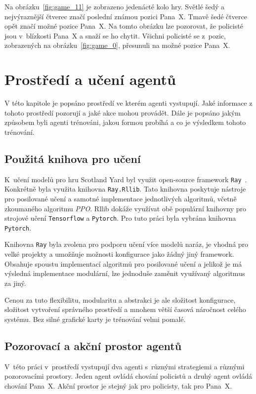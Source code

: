 Na obrázku~\ref{fig:game_11} je zobrazeno jedenácté kolo hry.
Světlé šedý a nejvýraznější čtverec značí poslední známou pozici Pana~X\@.
Tmavě šedé čtverce opět značí možné pozice Pana~X\@.
Na tomto obrázku lze pozorovat, že policisté jsou v~blízkosti Pana~X a snaží se ho chytit.
Všichni policisté se z~pozic, zobrazených na obrázku~\ref{fig:game_0}, přesunuli na možné pozice Pana~X\@.

\section{Prostředí a učení agentů}
\label{sec:implementace}

V této kapitole je popsáno prostředí ve kterém agenti vystupují.
Jaké informace z tohoto prostředí pozorují a jaké akce mohou provádět.
Dále je popsáno jakým způsobem byli agenti trénováni, jakou formou probíhá a co je výsledkem tohoto trénování.


\subsection{Použitá knihova pro učení}\label{subsec:pouzite-technologie}
K~učení modelů pro hru Scotland Yard byl využit open-source framework \texttt{Ray}~\cite{Ray,liang2018rllib}.
Konkrétně byla využita knihovna \texttt{Ray.Rllib}.
Tato knihovna poskytuje nástroje pro posilované učení a samotné implementace jednotlivých algoritmů, včetně zkoumaného algoritmu \emph{PPO}.
Rllib dokáže využívat obě populární knihovny pro strojové učení \texttt{Tensorflow} a \texttt{Pytorch}.
Pro tuto práci byla vybrána knihovna \texttt{Pytorch}.

Knihovna \texttt{Ray} byla zvolena pro podporu učení více modelů naráz, je vhodná pro velké projekty a umožňuje možnosti konfigurace jako žádný jiný framework.
Obsahuje spoustu implementací algoritmů pro posilované učení a jelikož je má výsledná implementace modulární, lze jednoduše zaměnit využívaný algoritmus za jiný.

Cenou za tuto flexibilitu, modularitu a abstrakci je ale složitost konfigurace, složitost vytvoření správného prostředí a mnohem větší časová náročnost celého systému.
Bez silné grafické karty je trénování velmi pomalé.

\subsection{Pozorovací a akční prostor agentů}
V~této práci v~prostředí vystupují dva agenti s~různými strategiemi a různými pozorovacími prostory.
Jeden agent ovládá chování policistů a druhý agent ovládá chování Pana~X\@.
Akční prostor je stejný jak pro policisty, tak pro Pana~X\@.


